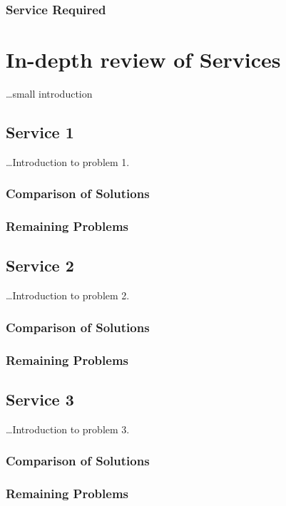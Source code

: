 \documentclass[a4paper]{article}
\begin{document}
  \subsubsection{Service Required}

\section{In-depth review of Services}
    \ldots small introduction
    \subsection{Service 1}

      \ldots Introduction to problem 1.

      \subsubsection{Comparison of Solutions}
      \subsubsection{Remaining Problems}

    \subsection{Service 2}

      \ldots Introduction to problem 2.

      \subsubsection{Comparison of Solutions}
      \subsubsection{Remaining Problems}

    \subsection{Service 3}
      \ldots Introduction to problem 3.

      \subsubsection{Comparison of Solutions}
      \subsubsection{Remaining Problems}
\end{document}
